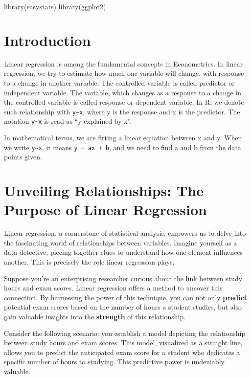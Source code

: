 \documentclass[
  letterpaper,
  paper =a4,
  twoside,
  openright,
  headsepline,
  footsepline,
  listof = totocnumbered,
  chapterprefix = true,
  firstiscover,
  parskip = full*]{scrbook}
\newenvironment{Shaded}{\begin{snugshade}}{\end{snugshade}}
\newcommand{\FunctionTok}[1]{\textcolor[rgb]{0.28,0.35,0.67}{#1}}
\newcommand{\NormalTok}[1]{\textcolor[rgb]{0.00,0.23,0.31}{#1}}
\begin{document}
\begin{Shaded}
\begin{Highlighting}[]
\FunctionTok{library}\NormalTok{(easystats)}
\FunctionTok{library}\NormalTok{(ggplot2)}
\end{Highlighting}
\end{Shaded}

\section{Introduction}\label{introduction-1}

Linear regression is among the fundamental concepts in Econometrics. In
linear regression, we try to estimate how much one variable will change,
with response to a change in another variable. The controlled variable
is called predictor or independent variable. The variable, which changes
as a response to a change in the controlled variable is called response
or dependent variable. In R, we denote such relationship with
\texttt{y\textasciitilde{}x}, where y is the response and x is the
predictor. The notation \texttt{y\textasciitilde{}x} is read as ``y
explained by x''.

In mathematical terms, we are fitting a linear equation between x and y.
When we write \texttt{y\textasciitilde{}x}, it means
\texttt{y\ =\ ax\ +\ b}, and we need to find a and b from the data
points given.

\section{Unveiling Relationships: The Purpose of Linear
Regression}\label{unveiling-relationships-the-purpose-of-linear-regression}

Linear regression, a cornerstone of statistical analysis, empowers us to
delve into the fascinating world of relationships between variables.
Imagine yourself as a data detective, piecing together clues to
understand how one element influences another. This is precisely the
role linear regression plays.

Suppose you're an enterprising researcher curious about the link between
study hours and exam scores. Linear regression offers a method to
uncover this connection. By harnessing the power of this technique, you
can not only \textbf{predict} potential exam scores based on the number
of hours a student studies, but also gain valuable insights into the
\textbf{strength} of this relationship.

Consider the following scenario: you establish a model depicting the
relationship between study hours and exam scores. This model, visualized
as a straight line, allows you to predict the anticipated exam score for
a student who dedicates a specific number of hours to studying. This
predictive power is undeniably valuable.
\end{document}
